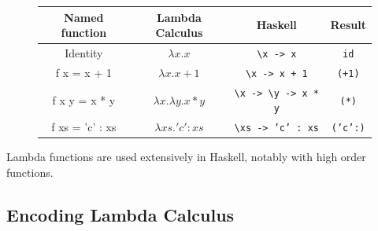 \documentclass[a4paper]{article}
\begin{document}
\begin{figure}[H]
    \centering
    \begin{tabular}{|c|c|c|c|}
        \hline
        Named function & Lambda Calculus & Haskell & Result\\
        \hline
        Identity & $\lambda x . x$ & \texttt{\textbackslash x -> x} & \texttt{id}\\
        \hline
        f x = x + 1 & $\lambda x . x + 1$ & \texttt{\textbackslash x -> x + 1} & \texttt{(+1)}\\
        \hline
        f x y = x * y & $\lambda x . \lambda y . x * y$ & \texttt{\textbackslash x -> \textbackslash y -> x * y} & \texttt{(*)}\\
        \hline
        f xs = 'c' : xs & $\lambda xs . 'c' : xs$ & \texttt{\textbackslash xs -> 'c' : xs} & \texttt{('c':)}\\
        \hline
    \end{tabular}
\end{figure}
\noindent
Lambda functions are used extensively in Haskell, notably with high order functions.

\subsection{Encoding Lambda Calculus}
\end{document}
